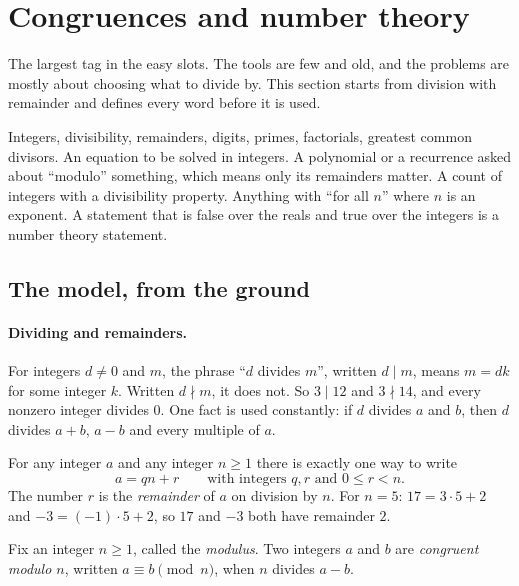 \section{Congruences and number theory}
\label{sec:numbertheory}

The largest tag in the easy slots. The tools are few and old, and the problems are mostly about choosing what to divide by. This section starts from division with remainder and defines every word before it is used.

\begin{recognise}
Integers, divisibility, remainders, digits, primes, factorials, greatest common divisors. An equation to be solved in integers. A polynomial or a recurrence asked about ``modulo'' something, which means only its remainders matter. A count of integers with a divisibility property. Anything with ``for all $n$'' where $n$ is an exponent. A statement that is false over the reals and true over the integers is a number theory statement.
\end{recognise}

\subsection*{The model, from the ground}

\paragraph{Dividing and remainders.} For integers $d \ne 0$ and $m$, the phrase ``$d$ divides $m$'', written $d \mid m$, means $m = dk$ for some integer $k$. Written $d \nmid m$, it does not. So $3 \mid 12$ and $3 \nmid 14$, and every nonzero integer divides $0$. One fact is used constantly: if $d$ divides $a$ and $b$, then $d$ divides $a + b$, $a - b$ and every multiple of $a$.

For any integer $a$ and any integer $n \ge 1$ there is exactly one way to write
\[
a = qn + r \qquad \text{with integers } q, r \text{ and } 0 \le r < n .
\]
The number $r$ is the \emph{remainder} of $a$ on division by $n$. For $n = 5$: $17 = 3 \cdot 5 + 2$ and $-3 = (-1) \cdot 5 + 2$, so $17$ and $-3$ both have remainder $2$.

\begin{definition}[Congruence]
Fix an integer $n \ge 1$, called the \emph{modulus}. Two integers $a$ and $b$ are \emph{congruent modulo $n$}, written $a \equiv b \pmod n$, when $n$ divides $a - b$.
\end{definition}

